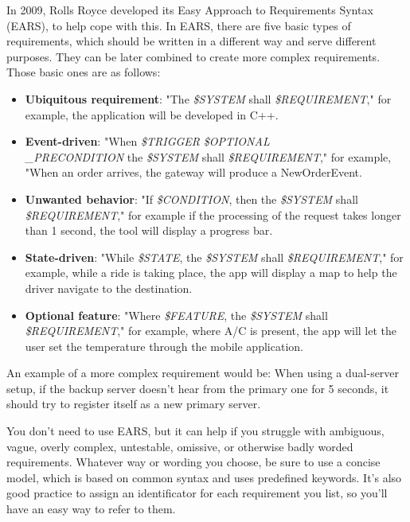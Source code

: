 In 2009, Rolls Royce developed its Easy Approach to Requirements Syntax (EARS), to help cope with this. In EARS, there are five basic types of requirements, which should be written in a different way and serve different purposes. They can be later combined to create more complex requirements. Those basic ones are as follows:

\begin{itemize}
\item 
\textbf{Ubiquitous requirement}: "The \textit{\$SYSTEM} shall \textit{\$REQUIREMENT}," for example, the application will be developed in C++.

\item 
\textbf{Event-driven}: "When \textit{\$TRIGGER} \textit{\$OPTIONAL\\\_PRECONDITION} the \textit{\$SYSTEM}
shall \textit{\$REQUIREMENT}," for example, "When an order arrives, the gateway will produce a NewOrderEvent.


\item 
\textbf{Unwanted behavior}: "If \textit{\$CONDITION}, then the \textit{\$SYSTEM} shall \textit{\$REQUIREMENT}," for example if the processing of the request takes longer than 1 second, the tool will display a progress bar.


\item
\textbf{State-driven}: "While \textit{\$STATE}, the \textit{\$SYSTEM} shall \textit{\$REQUIREMENT}," for example, while a ride is taking place, the app will display a map to help the driver navigate to the destination.

\item
\textbf{Optional feature}: "Where \textit{\$FEATURE}, the \textit{\$SYSTEM} shall \textit{\$REQUIREMENT}," for example, where A/C is present, the app will let the user set the temperature through the mobile application.

\end{itemize}

An example of a more complex requirement would be: When using a dual-server setup, if the backup server doesn't hear from the primary one for 5 seconds, it should try to register itself as a new primary server.

You don't need to use EARS, but it can help if you struggle with ambiguous, vague, overly complex, untestable, omissive, or otherwise badly worded requirements. Whatever way or wording you choose, be sure to use a concise model, which is based on common syntax and uses predefined keywords. It's also good practice to assign an identificator for each requirement you list, so you'll have an easy way to refer to them.

